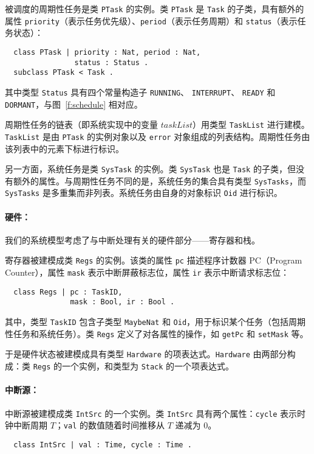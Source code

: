 被调度的周期性任务是类 \verb|PTask| 的实例。类 \verb|PTask| 是 \verb|Task| 的子类，具有额外的属性 \verb|priority|（表示任务优先级）、\verb|period|（表示任务周期）和 \verb|status|（表示任务状态）：
\begin{verbatim}
  class PTask | priority : Nat, period : Nat, 
                status : Status .
  subclass PTask < Task .
\end{verbatim}
其中类型 \verb|Status| 具有四个常量构造子 \verb|RUNNING|、 \verb|INTERRUPT|、 \verb|READY| 和 \verb|DORMANT|，与图~\ref{f:schedule} 相对应。

周期性任务的链表（即系统实现中的变量 $\mathit{taskList}$）用类型 \verb|TaskList| 进行建模。\verb|TaskList| 是由 \verb|PTask| 的实例对象以及 \verb|error| 对象组成的列表结构。周期性任务由该列表中的元素下标进行标识。

另一方面，系统任务是类 \verb|SysTask| 的实例。类 \verb|SysTask| 也是 \verb|Task| 的子类，但没有额外的属性。与周期性任务不同的是，系统任务的集合具有类型 \verb|SysTasks|，而 \verb|SysTasks| 是多重集而非列表。系统任务由自身的对象标识 \verb|Oid| 进行标识。

\paragraph{硬件：} 我们的系统模型考虑了与中断处理有关的硬件部分——寄存器和栈。

寄存器被建模成类 \verb|Regs| 的实例。该类的属性 \verb|pc| 描述程序计数器 PC（Program Counter），属性 \verb|mask| 表示中断屏蔽标志位，属性 \verb|ir| 表示中断请求标志位： 
\begin{verbatim}
  class Regs | pc : TaskID, 
               mask : Bool, ir : Bool .
\end{verbatim}
其中，类型 \verb|TaskID| 包含子类型 \verb|MaybeNat| 和 \verb|Oid|，用于标识某个任务（包括周期性任务和系统任务）。类 \verb|Regs| 定义了对各属性的操作，如 \verb|getPc| 和 \verb|setMask| 等。 

于是硬件状态被建模成具有类型 \verb|Hardware| 的项表达式。\verb|Hardware| 由两部分构成：类 \verb|Regs| 的一个实例，和类型为 \verb|Stack| 的一个项表达式。

\paragraph{中断源：} 中断源被建模成类 \verb|IntSrc| 的一个实例。类 \verb|IntSrc| 具有两个属性：\verb|cycle| 表示时钟中断周期 $T$；\verb|val| 的数值随着时间推移从 $T$ 递减为 $0$。
\begin{verbatim}
  class IntSrc | val : Time, cycle : Time .
\end{verbatim}


